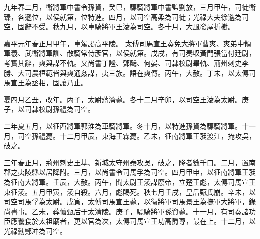 \begin{pinyinscope}
 
 
 
 九年春二月，衞將軍中書令孫資，癸巳，驃騎將軍中書監劉放，三月甲午，司徒衞臻，各遜位，以侯就第，位特進。四月，以司空高柔為司徒；光祿大夫徐邈為司空，固辭不受。秋九月，以車騎將軍王淩為司空。冬十月，大風發屋折樹。
 
 
嘉平元年春正月甲午，車駕謁高平陵。
 太傅司馬宣王奏免大將軍曹爽、爽弟中領軍羲、武衞將軍訓、散騎常侍彥官，以侯就第。戊戌，有司奏収黃門張當付廷尉，考實其辭，爽與謀不軌。又尚書丁謐、鄧颺、何晏、司隷校尉畢軌、荊州刺史李勝、大司農桓範皆與爽通姦謀，夷三族。語在爽傳。丙午，大赦。丁未，以太傅司馬宣王為丞相，固讓乃止。
 
 
 
 
 夏四月乙丑，改年。丙子，太尉蔣濟薨。冬十二月辛卯，以司空王淩為太尉。庚子，以司隷校尉孫禮為司空。
 
 
 
 
 二年夏五月，以征西將軍郭淮為車騎將軍。冬十月，以特進孫資為驃騎將軍。十一月，司空孫禮薨。十二月甲辰，東海王霖薨。乙未，征南將軍王昶渡江，掩攻吳，破之。
 
 
 
 
 三年春正月，荊州刺史王基、新城太守州泰攻吳，破之，降者數千口。二月，置南郡之夷陵縣以居降附。三月，以尚書令司馬孚為司空。四月甲申，以征南將軍王昶為征南大將軍。壬辰，大赦。丙午，聞太尉王淩謀廢帝，立楚王彪，太傅司馬宣王東征淩。五月甲寅，淩自殺。六月，彪賜死。秋七月壬戌，皇后甄氏崩。辛未，以司空司馬孚為太尉。戊寅，太傅司馬宣王薨，以衞將軍司馬景王為撫軍大將軍，錄尚書事。乙未，葬懷甄后于太清陵。庚子，驃騎將軍孫資薨。十一月，有司奏諸功臣應饗食於太祖廟者，更以官為次，太傅司馬宣王功高爵尊，最在上。十二月，以光祿勳鄭冲為司空。
 

\end{pinyinscope}
